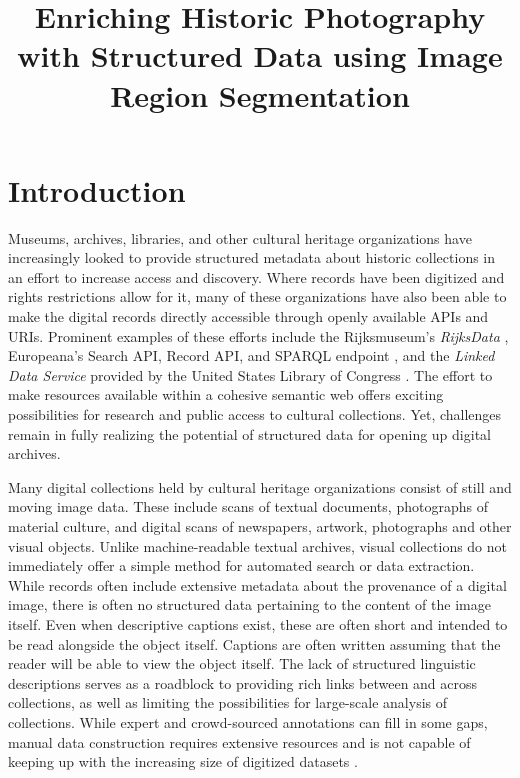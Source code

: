 \documentclass[10pt, a4paper]{article}
\title{\textbf{Enriching Historic Photography with Structured Data
using Image Region Segmentation}}
\begin{document}
\maketitleabstract

\section{Introduction}

Museums, archives, libraries, and other cultural heritage organizations have
increasingly looked to provide structured metadata about historic collections
in an effort to increase access and discovery. Where records have been
digitized and rights restrictions allow for it, many of these organizations
have also been able to make the digital records directly accessible through
openly available APIs and URIs. Prominent examples of these efforts include the
Rijksmuseum's \textit{RijksData} \cite{dijkshoorn2018rijksmuseum}, Europeana's
Search API, Record API, and SPARQL endpoint \cite{concordia2009not}, and the
\textit{Linked Data Service} provided by the United States Library of Congress
\cite{zimmer2015twitter}. The effort to make resources available
within a cohesive semantic web offers exciting possibilities for research and
public access to cultural collections. Yet, challenges remain in fully realizing
the potential of structured data for opening up digital archives.

Many digital collections held by cultural heritage organizations consist of
still and moving image data. These include scans of textual documents,
photographs of material culture, and digital scans of newspapers, artwork,
photographs and other visual objects. Unlike machine-readable textual archives,
visual collections do not immediately offer a simple method for automated
search or data extraction. While records often include extensive metadata
about the provenance of a digital image, there is often no structured data
pertaining to the content of the image itself. Even when descriptive captions
exist, these are often short and intended to be read alongside the object itself.
Captions are often written assuming that the reader will be able to view the
object itself. The lack of
structured linguistic descriptions serves as a roadblock to providing rich links
between and across collections, as well as limiting the possibilities for
large-scale analysis of collections. While expert and crowd-sourced annotations
can fill in some gaps, manual data construction requires extensive resources
and is not capable of keeping up with the increasing size of digitized datasets
\cite{seitsonen2017crowdsourcing}.
\end{document}
